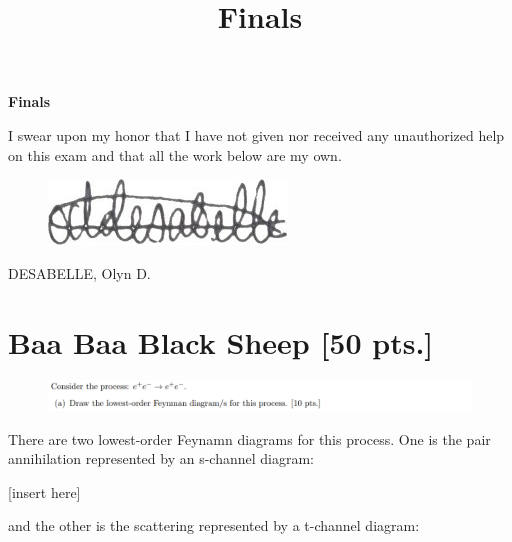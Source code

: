 \documentclass[11pt]{article}
\theoremstyle{definition}
\numberwithin{equation}{section}
\begin{document}
\title{Finals}

\pagestyle{fancy}
\fancyhf{}

\begin{center}
{\LARGE \bf Finals}\\
\end{center}

\begin{mdframed}
    I swear upon my honor that I have not given nor received any unauthorized help on this exam and that all the work below are my own.
\end{mdframed}
\begin{figure}[H]
    \includegraphics[scale = 20]{my e-sig.jpg}
\end{figure}

DESABELLE, Olyn D.

\noindent\makebox[\linewidth]{\rule{\paperwidth}{0.4pt}}

\section{\textbf{Baa Baa Black Sheep} [50 pts.]}


\begin{figure}[H]
    \centering
    \includegraphics[scale = 0.4]{1a.png}
\end{figure}

There are two lowest-order Feynamn diagrams for this process. One is the pair annihilation represented by an s-channel diagram:

[insert here]

and the other is the scattering represented by a t-channel diagram:
\end{document}
